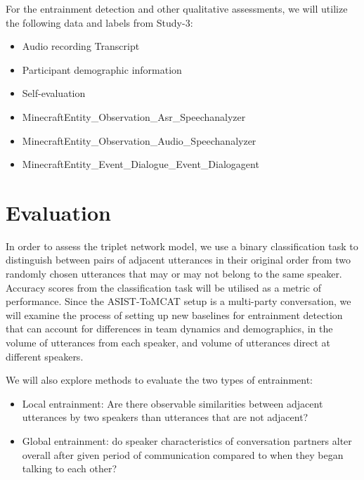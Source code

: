     For the entrainment detection and other qualitative assessments, we will
    utilize the following data and labels from Study-3:

            \begin{itemize}               
                   \item Audio recording
                    Transcript
                   \item Participant demographic information
                   \item Self-evaluation
                   \item MinecraftEntity\_Observation\_Asr\_Speechanalyzer
                   \item MinecraftEntity\_Observation\_Audio\_Speechanalyzer
                   \item MinecraftEntity\_Event\_Dialogue\_Event\_Dialogagent
            \end{itemize}

\section{Evaluation}

    In order to assess the triplet network model, we use a binary
    classification task to distinguish between pairs of adjacent utterances in
    their original order from two randomly chosen utterances that may or may
    not belong to the same speaker. Accuracy scores from the classification
    task will be utilised as a metric of performance. Since the ASIST-ToMCAT
    setup is a multi-party conversation, we will examine the process of setting
    up new baselines for entrainment detection that can account for differences
    in team dynamics and demographics, in the volume of utterances from each
    speaker, and volume of utterances direct at different speakers.

    We will also explore methods to evaluate the two types of entrainment:

    \begin{itemize}

        \item Local entrainment: Are there observable similarities between
            adjacent utterances by two speakers than utterances that are not
            adjacent?

        \item Global entrainment: do speaker characteristics of conversation
            partners alter overall after given period of communication compared
            to when they began talking to each other?

    \end{itemize}

